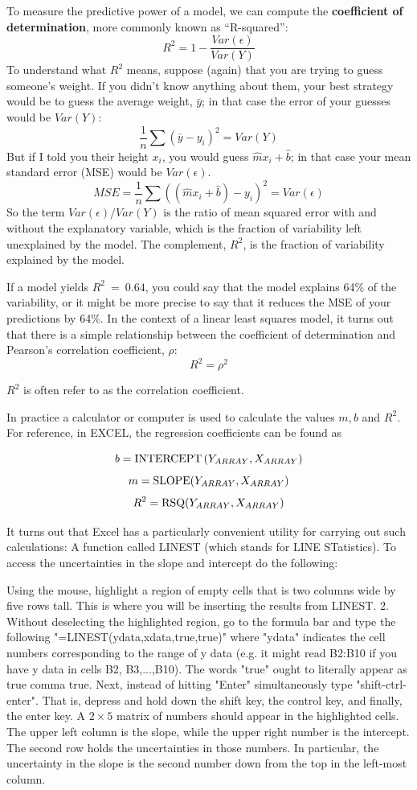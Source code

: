 To measure the predictive power of a model, we can compute the {\bf
  coefficient of determination}, more commonly known as ``R-squared'':
%
\[ R^2 = 1 - \frac{Var(\epsilon)}{Var(Y)}\]
%
To understand what $R^2$ means, suppose (again) that you are trying
to guess someone's weight.  If you didn't know anything about them,
your best strategy would be to guess the average weight, $\bar{y}$; in
that case the error of your guesses would be $Var(Y)$:
%
\[\frac{1}{n} \sum (\bar{y} - y_i)^2 = Var(Y) \]
%
But if I told you their height $x_i$, you would guess $\hat{m} x_i + \hat{b} $; in that case your mean standard error (MSE) would be $Var(\epsilon)$.
%
\[ MSE = 
\frac{1}{n} \sum ((\hat{m} x_i + \hat{b}) - y_i)^2 =
Var(\epsilon) \]
%
So the term $Var(\epsilon)/Var(Y)$ is the ratio of mean squared error with
and without the explanatory variable, which is the fraction of
variability left unexplained by the model.  The complement, $R^2$,
is the fraction of variability explained by the model.

If a model yields $R^2~=~0.64$, you could say that the model explains
64\% of the variability, or it might be more precise to say that it
reduces the MSE of your predictions by 64\%. In the context of a linear least squares model, it turns out that
there is a simple relationship between the coefficient of
determination and Pearson's correlation coefficient, $\rho$:
\[ R^2 = \rho^2  \]

$R^2$ is often refer to as the correlation coefficient.

In practice a calculator or computer is used to calculate the values $m, b$ and $R^2$.  For reference, in EXCEL, the regression coefficients can be found as

\[b={\rm INTERCEPT}\left(Y_{ARRAY},X_{ARRAY}\right)\] 
\[m={\rm SLOPE}(Y_{ARRAY},X_{ARRAY})\] 
\[R^2={\rm RSQ}(Y_{ARRAY},X_{ARRAY})\]
 
It turns out that Excel has a particularly convenient utility for carrying out such calculations: A function called LINEST (which stands for LINE STatistics). To access the uncertainties in the slope and intercept do the following:

Using the mouse, highlight a region of empty cells that is two columns wide by five rows tall. This is where you will be inserting the results from LINEST.
2. Without deselecting the highlighted region, go to the formula bar and type the following "=LINEST(ydata,xdata,true,true)" where "ydata" indicates the cell numbers corresponding to the range of y data (e.g. it might read B2:B10 if you have y data in cells B2, B3,...,B10). The words "true" ought to literally appear as true comma true. Next, instead of hitting "Enter" simultaneously type 
"shift-ctrl-enter". That is, depress and hold down the shift key, the
control key, and finally, the enter key. A $2\times 5$ matrix of numbers should appear in the highlighted cells. The upper left column is the
slope, while the upper right number is the intercept.
The second row holds the uncertainties in those numbers. In particular,
the uncertainty in the slope is the second number down from the top in the left-most column.



